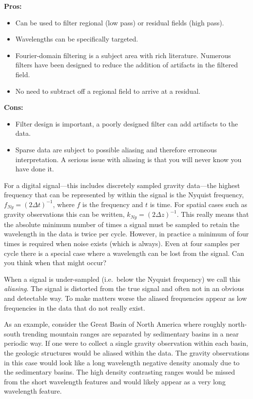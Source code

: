 {\bf Pros:}
\begin{itemize}
    \item Can be used to filter regional (low pass) or residual fields (high pass).
    \item Wavelengths can be specifically targeted.
    \item Fourier-domain filtering is a subject area with rich literature.  Numerous filters have been designed to reduce the addition of artifacts in the filtered field.
    \item No need to subtract off a regional field to arrive at a residual.
\end{itemize}
{\bf Cons:}
\begin{itemize}
    \item Filter design is important, a poorly designed filter can add artifacts to the data.
    \item Sparse data are subject to possible aliasing and therefore erroneous interpretation.  A serious issue with aliasing is that you will never know you have done it.
\end{itemize}

\begin{framed}
  For a digital signal---this includes discretely sampled gravity data---the highest frequency that can be represented by within the signal is the Nyquist frequency, $f_{Ny} = (2 \Delta t)^{-1}$, where $f$ is the frequency and $t$ is time.  For spatial cases such as gravity observations this can be written, $k_{Ny} = (2 \Delta z)^{-1}$.  This really means that the absolute minimum number of times a signal must be sampled to retain the wavelength in the data is twice per cycle.  However, in practice a minimum of four times is required when noise exists (which is always).  Even at four samples per cycle there is a special case where a wavelength can be lost from the signal.  Can you think when that might occur?

When a signal is under-sampled (i.e.\ below the Nyquist frequency) we call this {\it aliasing}.  The signal is distorted from the true signal and often not in an obvious and detectable way.  To make matters worse the aliased frequencies appear as low frequencies in the data that do not really exist.

As an example, consider the Great Basin of North America where roughly north-south trending mountain ranges are separated by sedimentary basins in a near periodic way.  If one were to collect a single gravity observation within each basin, the geologic structures would be aliased within the data.  The gravity observations in this case would look like a long wavelength negative density anomaly due to the sedimentary basins.  The high density contrasting ranges would be missed from the short wavelength features and would likely appear as a very long wavelength feature.
\end{framed}

